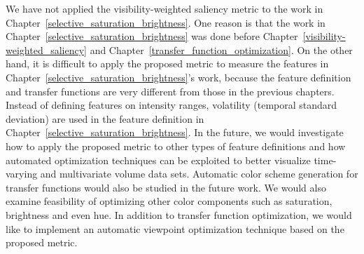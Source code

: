 We have not applied the visibility-weighted saliency metric to the work in Chapter~\ref{selective_saturation_brightness}. One reason is that the work in Chapter~\ref{selective_saturation_brightness} was done before Chapter~\ref{visibility-weighted_saliency} and Chapter~\ref{transfer_function_optimization}. On the other hand, it is difficult to apply the proposed metric to measure the features in Chapter~\ref{selective_saturation_brightness}'s work, because the feature definition and transfer functions are very different from those in the previous chapters. Instead of defining features on intensity ranges, volatility (temporal standard deviation) are used in the feature definition in Chapter~\ref{selective_saturation_brightness}.
In the future, we would investigate how to apply the proposed metric to other types of feature definitions and how automated optimization techniques can be exploited to better visualize time-varying and multivariate volume data sets. Automatic color scheme generation \cite{zhou_automatic_2009} for transfer functions would also be studied in the future work.
We would also examine feasibility of optimizing other color components such as saturation, brightness and even hue. 
In addition to transfer function optimization, we would like to implement an automatic viewpoint optimization technique based on the proposed metric.

